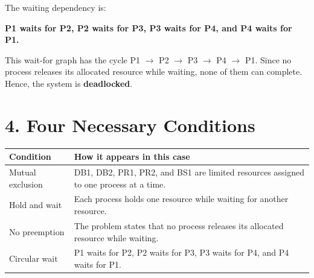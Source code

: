 \documentclass[12pt,a4paper]{article}
\begin{document}
The waiting dependency is:

\begin{center}
\textbf{P1 waits for P2, P2 waits for P3, P3 waits for P4, and P4 waits for P1.}
\end{center}

\begin{center}
\end{center}

This wait-for graph has the cycle P1 $\rightarrow$ P2 $\rightarrow$ P3 $\rightarrow$ P4 $\rightarrow$ P1. Since no process releases its allocated resource while waiting, none of them can complete. Hence, the system is \textbf{deadlocked}.

\section*{4. Four Necessary Conditions}

\begin{center}
\begin{tabular}{L{3.5cm} L{10cm}}
\toprule
\textbf{Condition} & \textbf{How it appears in this case} \\
\midrule
Mutual exclusion & DB1, DB2, PR1, PR2, and BS1 are limited resources assigned to one process at a time. \\
Hold and wait & Each process holds one resource while waiting for another resource. \\
No preemption & The problem states that no process releases its allocated resource while waiting. \\
Circular wait & P1 waits for P2, P2 waits for P3, P3 waits for P4, and P4 waits for P1. \\
\bottomrule
\end{tabular}
\end{center}
\end{document}
